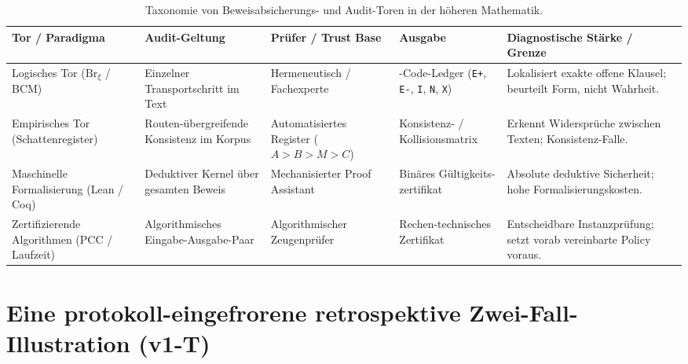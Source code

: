 \documentclass[11pt,a4paper]{article}
\begin{document}
\begin{table}[htbp]
\centering
\footnotesize
\renewcommand{\arraystretch}{0.92}
\setlength{\tabcolsep}{3pt}
\caption{Taxonomie von Beweisabsicherungs- und Audit-Toren in der höheren Mathematik.}
\label{tab:tor_taxonomie}\label{tab:gate_taxonomy}
\begin{tabularx}{\textwidth}{@{} >{\raggedright\arraybackslash}p{} >{\raggedright\arraybackslash}p{} >{\raggedright\arraybackslash}p{} >{\raggedright\arraybackslash}p{} >{\raggedright\arraybackslash}X@{}}
\toprule
Tor / Paradigma & Audit-Geltung & Prüfer / Trust Base & Ausgabe & Diagnostische Stärke / Grenze \\
\midrule
Logisches Tor ($\mathrm{Br}_\xi$ / BCM) & Einzelner Transportschritt im Text & Hermeneutisch / Fachexperte & 5-Code-Ledger (\texttt{E+}, \texttt{E-}, \texttt{I}, \texttt{N}, \texttt{X}) & Lokalisiert exakte offene Klausel; beurteilt Form, nicht Wahrheit. \\
\addlinespace[4pt]
Empirisches Tor (Schattenregister) & Routen-\allowbreak übergreifende Konsistenz im Korpus & Au\-to\-ma\-ti\-sier\-tes Register ($A>B>M>C$) & Konsistenz- / Kollisionsmatrix & Erkennt Widersprüche zwischen Texten; Konsistenz-Falle. \\
\addlinespace[4pt]
Maschinelle Formalisierung (Lean / Coq) & Deduktiver Kernel über gesamten Beweis & Mechanisierter Proof Assistant & Binäres Gültigkeits-\allowbreak zertifikat & Absolute deduktive Sicherheit; hohe Formalisierungskosten. \\
\addlinespace[4pt]
Zertifizierende Algorithmen (PCC / Laufzeit) & Algorithmisches Eingabe-Ausgabe-Paar & Al\-go\-rith\-mi\-scher Zeugenprüfer & Rechen-\allowbreak technisches Zertifikat & Entscheidbare Instanzprüfung; setzt vorab vereinbarte Policy voraus. \\
\bottomrule
\end{tabularx}
\end{table}

\section[Eine protokoll-eingefrorene\texorpdfstring{\newline}{ }retrospektive Zwei-Fall-Illustration (v1-T)]{Eine protokoll-ein\-ge\-fro\-rene re\-tro\-spek\-ti\-ve Zwei-Fall-Il\-lus\-tra\-ti\-on (v1-T)}\label{sec:calibration}
\end{document}
